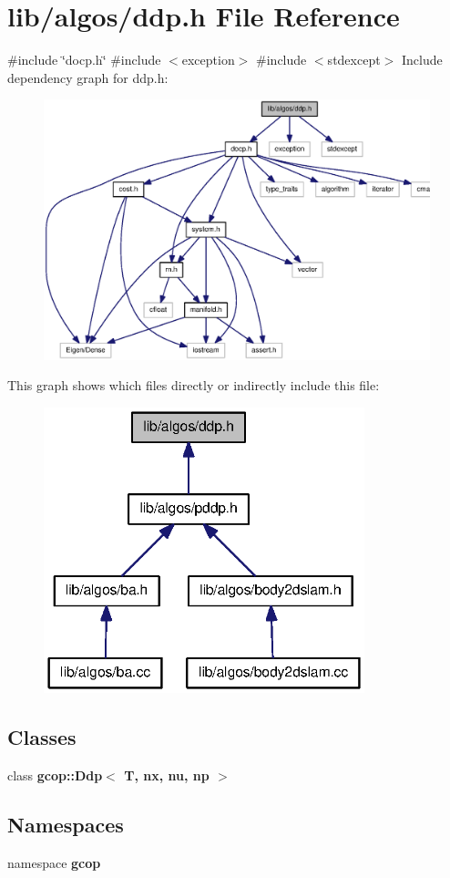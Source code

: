 \section{lib/algos/ddp.h \-File \-Reference}
\label{ddp_8h}
{\ttfamily \#include \char`\"{}docp.\-h\char`\"{}}\*
{\ttfamily \#include $<$exception$>$}\*
{\ttfamily \#include $<$stdexcept$>$}\*
\-Include dependency graph for ddp.\-h\-:
\nopagebreak
\begin{figure}[H]
\begin{center}
\leavevmode
\includegraphics[width=350pt]{ddp_8h__incl}
\end{center}
\end{figure}
\-This graph shows which files directly or indirectly include this file\-:
\nopagebreak
\begin{figure}[H]
\begin{center}
\leavevmode
\includegraphics[width=264pt]{ddp_8h__dep__incl}
\end{center}
\end{figure}
\subsection*{\-Classes}
\begin{DoxyCompactItemize}
\item 
class {\bf gcop\-::\-Ddp$<$ T, nx, nu, np $>$}
\end{DoxyCompactItemize}
\subsection*{\-Namespaces}
\begin{DoxyCompactItemize}
\item 
namespace {\bf gcop}
\end{DoxyCompactItemize}
